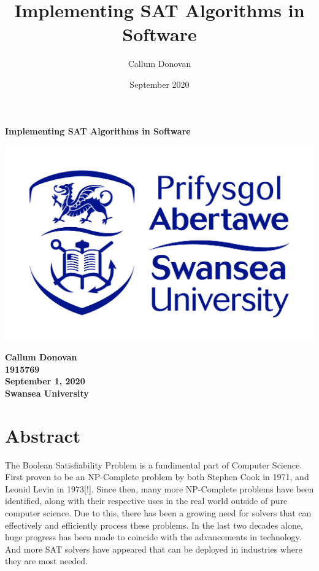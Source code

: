 \documentclass{article}
\title{\bfseries Implementing SAT Algorithms in Software}
\author{Callum Donovan}
\date{September 2020}
\begin{document}
\begin{titlepage}
    \begin{center}
        \Large{\bfseries Implementing SAT Algorithms in Software} \\
        \vspace{4cm}
        \begin{center}
            \includegraphics[scale=0.2]{swan.jpg}
        \end{center}
        \vspace*{\fill}
        \bfseries{\large Callum Donovan \\
            1915769 \\
            September 1, 2020 \\
            Swansea University \\}
    \end{center}
\end{titlepage}

\section{Abstract}
The Boolean Satisfiability Problem is a fundimental part of Computer Science. First proven to be an
NP-Complete problem by both Stephen Cook in 1971, and Leonid Levin in 1973[!]. Since then, many more
NP-Complete problems have been identified, along with their respective uses in the real world
outside of pure computer science. Due to this, there has been a growing need for solvers that can
effectively and efficiently process these problems. In the last two decades alone, huge progress has
been made to coincide with the advancements in technology. And more SAT solvers have appeared that
can be deployed in industries where they are most needed.
\end{document}
